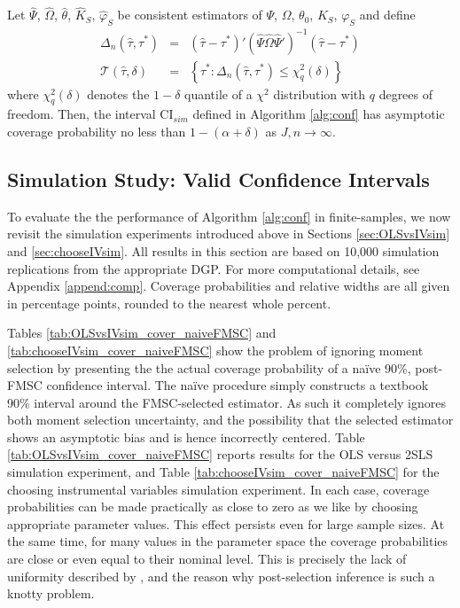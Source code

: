 \begin{thm}
\label{pro:sim}
Let $\widehat{\Psi}$, $\widehat{\Omega}$, $\widehat{\theta}$, $\widehat{K}_S$, $\widehat{\varphi}_S$ be consistent estimators of $\Psi$, $\Omega$, $\theta_0$, $K_S$, $\varphi_S$ and define 
\begin{eqnarray*}
	\Delta_n(\widehat{\tau},\tau^*) &=& \left(\widehat{\tau} - \tau^*\right)' \left(\widehat{\Psi}\widehat{\Omega}\widehat{\Psi}'\right)^{-1} \left(\widehat{\tau} - \tau^*\right)\\
	\mathscr{T}(\widehat{\tau},\delta) &=& \left\{\tau^* \colon  \Delta_n(\widehat{\tau},\tau^*) \leq \chi^2_q(\delta)\right\}
\end{eqnarray*}
where $\chi^2_q(\delta)$ denotes the $1-\delta$ quantile of a $\chi^2$ distribution with $q$ degrees of freedom.
Then, the interval $\mbox{CI}_{sim}$ defined in Algorithm \ref{alg:conf} has asymptotic coverage probability no less than $1-(\alpha + \delta)$ as $J,n\rightarrow \infty$.
\end{thm}

\subsection{Simulation Study: Valid Confidence Intervals}
To evaluate the the performance of Algorithm \ref{alg:conf} in finite-samples, we now revisit the simulation experiments introduced above in Sections \ref{sec:OLSvsIVsim} and \ref{sec:chooseIVsim}.
All results in this section are based on 10,000 simulation replications from the appropriate DGP.
For more computational details, see Appendix \ref{append:comp}.
Coverage probabilities and relative widths are all given in percentage points, rounded to the nearest whole percent.

Tables \ref{tab:OLSvsIVsim_cover_naiveFMSC} and \ref{tab:chooseIVsim_cover_naiveFMSC} show the problem of ignoring moment selection by presenting the the actual coverage probability of a na\"{i}ve 90\%, post-FMSC confidence interval.
The na\"{i}ve procedure simply constructs a textbook 90\% interval around the FMSC-selected estimator. 
As such it completely ignores both moment selection uncertainty, and the possibility that the selected estimator shows an asymptotic bias and is hence incorrectly centered.
Table \ref{tab:OLSvsIVsim_cover_naiveFMSC} reports results for the OLS versus 2SLS simulation experiment, and Table \ref{tab:chooseIVsim_cover_naiveFMSC} for the choosing instrumental variables simulation experiment.
In each case, coverage probabilities can be made practically as close to zero as we like by choosing appropriate parameter values.
This effect persists even for large sample sizes.
At the same time, for many values in the parameter space the coverage probabilities are close or even equal to their nominal level.
This is precisely the lack of uniformity described by \cite{LeebPoetscher2005}, and the reason why post-selection inference is such a knotty problem.


